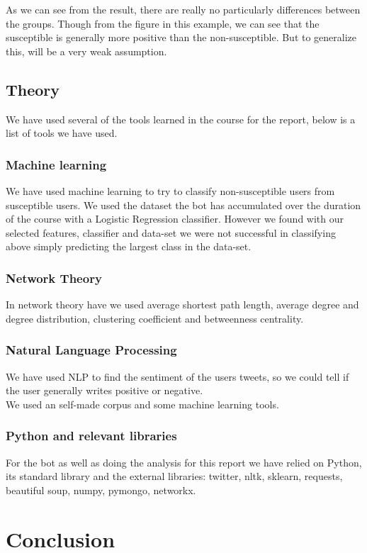 \documentclass[10pt]{IEEEtran}
\begin{document}
As we can see from the result, there are really no particularly differences between the groups. Though from the figure in this example, we can see that the susceptible is generally more positive than the non-susceptible. But to generalize this, will be a very weak assumption. 

\subsection{Theory}
We have used several of the tools learned in the course for the report, below is a list of tools we have used.\\
\subsubsection{Machine learning}
We have used machine learning to try to classify non-susceptible users from susceptible users. We used the dataset the bot has accumulated over the duration of the course with a Logistic Regression classifier. However we found with our selected features, classifier and data-set we were not successful in classifying above simply predicting the largest class in the data-set.\\
\subsubsection{Network Theory}
In network theory have we used average shortest path length, average degree and degree distribution, clustering coefficient and betweenness centrality. \\
\subsubsection{Natural Language Processing}
We have used NLP to find the sentiment of the users tweets, so we could tell if the user generally writes positive or negative.\\
We used an self-made corpus and some machine learning tools. \\
\subsubsection{Python and relevant libraries}
For the bot as well as doing the analysis for this report we have relied on Python, its standard library and the external libraries: twitter, nltk, sklearn, requests, beautiful soup, numpy, pymongo, networkx.
\section{Conclusion}
\end{document}
